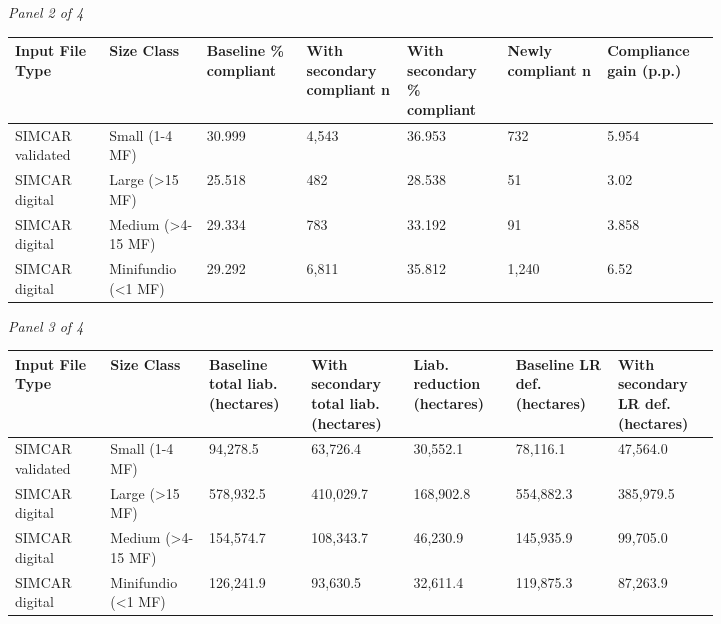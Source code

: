 \documentclass[12pt]{article}
\begin{document}
\begin{landscape}
\begin{table}[H]
\textit{Panel 2 of 4}\\[2pt]
{\fontsize{12}{14}\selectfont
\setlength{\tabcolsep}{3pt}
\renewcommand{\arraystretch}{1.08}
\begin{tabular}{p{0.117\linewidth}p{0.117\linewidth}p{0.117\linewidth}p{0.117\linewidth}p{0.117\linewidth}p{0.117\linewidth}p{0.117\linewidth}}
\toprule
Input File Type & Size Class & Baseline \% compliant & With secondary compliant n & With secondary \% compliant & Newly compliant n & Compliance gain (p.p.) \\
\midrule
SIMCAR validated & Small (1-4 MF) & 30.999 & 4,543 & 36.953 & 732 & 5.954 \\
SIMCAR digital & Large (>15 MF) & 25.518 & 482 & 28.538 & 51 & 3.02 \\
SIMCAR digital & Medium (>4-15 MF) & 29.334 & 783 & 33.192 & 91 & 3.858 \\
SIMCAR digital & Minifundio (<1 MF) & 29.292 & 6,811 & 35.812 & 1,240 & 6.52 \\
\bottomrule
\end{tabular}
}

\vspace{0.6em}

\textit{Panel 3 of 4}\\[2pt]
{\fontsize{12}{14}\selectfont
\setlength{\tabcolsep}{3pt}
\renewcommand{\arraystretch}{1.08}
\begin{tabular}{p{0.117\linewidth}p{0.117\linewidth}p{0.117\linewidth}p{0.117\linewidth}p{0.117\linewidth}p{0.117\linewidth}p{0.117\linewidth}}
\toprule
Input File Type & Size Class & Baseline total liab. (hectares) & With secondary total liab. (hectares) & Liab. reduction (hectares) & Baseline LR def. (hectares) & With secondary LR def. (hectares) \\
\midrule
SIMCAR validated & Small (1-4 MF) & 94,278.5 & 63,726.4 & 30,552.1 & 78,116.1 & 47,564.0 \\
SIMCAR digital & Large (>15 MF) & 578,932.5 & 410,029.7 & 168,902.8 & 554,882.3 & 385,979.5 \\
SIMCAR digital & Medium (>4-15 MF) & 154,574.7 & 108,343.7 & 46,230.9 & 145,935.9 & 99,705.0 \\
SIMCAR digital & Minifundio (<1 MF) & 126,241.9 & 93,630.5 & 32,611.4 & 119,875.3 & 87,263.9 \\
\bottomrule
\end{tabular}
}

\vspace{0.6em}


\end{table}
\end{landscape}
\end{document}
